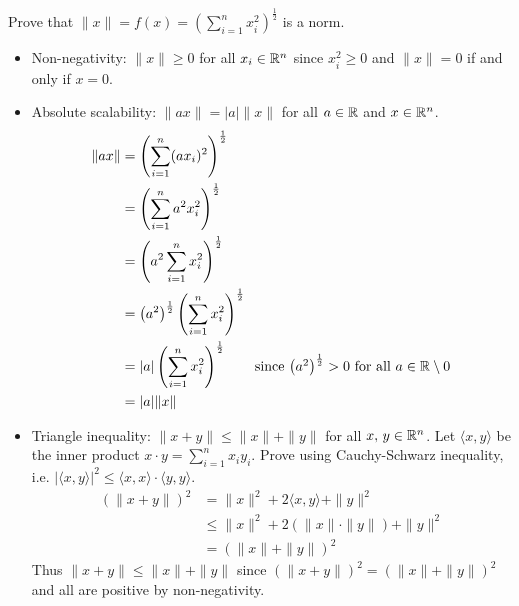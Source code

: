 Prove that $\| x \| = f(x) = \left( \sum_{i=1}^n x_i^2 \right)^{\frac{1}{2}}$ is a norm.
\begin{itemize}
    \item Non-negativity: $\| x \| \geq 0$ for all $x_i \in \mathbb{R}^n$ since $x_i^2 \geq 0$ and $\| x \| = 0$ if and only if $x = 0$.
    \item Absolute scalability: $\| ax \| = \lvert a \rvert \| x \|$ for all $a \in \mathbb{R}$ and $x \in \mathbb{R}^n$. 
	\begin{align*}
	    \| ax \| &= \left( \sum_{i=1}^n (ax_i)^2 \right)^{\frac{1}{2}} \\
		&= \left( \sum_{i=1}^n a^2 x_i^2 \right)^{\frac{1}{2}} \\
		&= \left(a^2 \sum_{i=1}^n x_i^2 \right)^{\frac{1}{2}} \\
		&= \left( a^2 \right)^{\frac{1}{2}} \left( \sum_{i=1}^n x_i^2 \right)^{\frac{1}{2}} \\
		&= \lvert a \rvert \left( \sum_{i=1}^n x_i^2 \right)^{\frac{1}{2}} \tag*{since $\left( a^2 \right)^{\frac{1}{2}} > 0$ for all $a \in \R \setminus 0$} \\
		&= \lvert a \rvert \| x \|
	\end{align*}
    \item Triangle inequality: $\| x + y \| \leq \| x \| + \| y \|$ for all $x, \, y \in \mathbb{R}^n$. 
	Let $\langle x, y \rangle$ be the inner product $x \cdot y = \sum_{i=1}^n x_i y_i$. 
	Prove using Cauchy-Schwarz inequality, i.e. $\lvert \langle x, y \rangle \rvert^2 \leq \langle x, x \rangle \cdot \langle y, y \rangle$.
	\begin{align*}
	    \left( \| x + y \| \right)^2 &= \| x \|^2 + 2 \langle x, y \rangle + \| y \|^2 \\
		&\leq \| x \|^2 + 2 \left( \| x \| \cdot \| y \| \right) + \| y \|^2 \\
		&= \left( \| x \| + \| y \| \right)^2
	\end{align*}
	Thus $\| x + y \| \leq \| x \| + \| y \|$ since $\left( \| x + y \| \right)^2 = \left( \| x \| + \| y \| \right)^2$ and all are positive by non-negativity.
\end{itemize}
    
